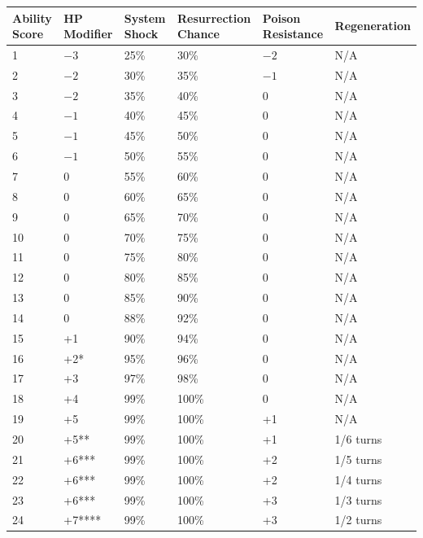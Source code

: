 \noindent
\begin{minipage}{\columnwidth}

\label{constitutionscore}
\noindent
\begin{tabular}{|m{}|m{}|m{}|m{}|m{}|m{}|}
\hline
Ability Score	& HP Modifier	& System Shock	& Resur\-rection Chance	& Poison Resistance	& Regeneration \\
\hline\hline
\rowcolor[gray]{.9}1	& $-3$		& 25\%	& 30\%	& $-2$		& N/A \\
2	& $-2$		& 30\%	& 35\%	& $-1$		& N/A \\
\rowcolor[gray]{.9}3	& $-2$		& 35\%	& 40\%	& 0		& N/A \\
4	& $-1$		& 40\%	& 45\%	& 0		& N/A \\
\rowcolor[gray]{.9}5	& $-1$		& 45\%	& 50\%	& 0		& N/A \\
6	& $-1$		& 50\%	& 55\%	& 0		& N/A \\
\rowcolor[gray]{.9}7	& 0			& 55\%	& 60\%	& 0		& N/A \\
8	& 0			& 60\%	& 65\%	& 0		& N/A \\
\rowcolor[gray]{.9}9	& 0			& 65\%	& 70\%	& 0		& N/A \\
10	& 0			& 70\%	& 75\%	& 0		& N/A \\
\rowcolor[gray]{.9}11	& 0			& 75\%	& 80\%	& 0		& N/A \\
12	& 0			& 80\%	& 85\%	& 0		& N/A \\
\rowcolor[gray]{.9}13	& 0			& 85\%	& 90\%	& 0		& N/A \\
14	& 0			& 88\%	& 92\%	& 0		& N/A \\
\rowcolor[gray]{.9}15	& +1		& 90\%	& 94\%	& 0		& N/A \\
16	& +2*		& 95\%	& 96\%	& 0		& N/A \\
\rowcolor[gray]{.9}17	& +3		& 97\%	& 98\%	& 0		& N/A \\
18	& +4		& 99\%	& 100\%	& 0		& N/A \\
\rowcolor[gray]{.9}19	& +5		& 99\%	& 100\%	& +1	& N/A \\
20	& +5**		& 99\%	& 100\%	& +1	& 1/6 turns \\
\rowcolor[gray]{.9}21	& +6***		& 99\%	& 100\%	& +2	& 1/5 turns \\
22	& +6***		& 99\%	& 100\%	& +2	& 1/4 turns \\
\rowcolor[gray]{.9}23	& +6***		& 99\%	& 100\%	& +3	& 1/3 turns \\
24	& +7****	& 99\%	& 100\%	& +3	& 1/2 turns \\

\end{tabular}
\end{minipage}
